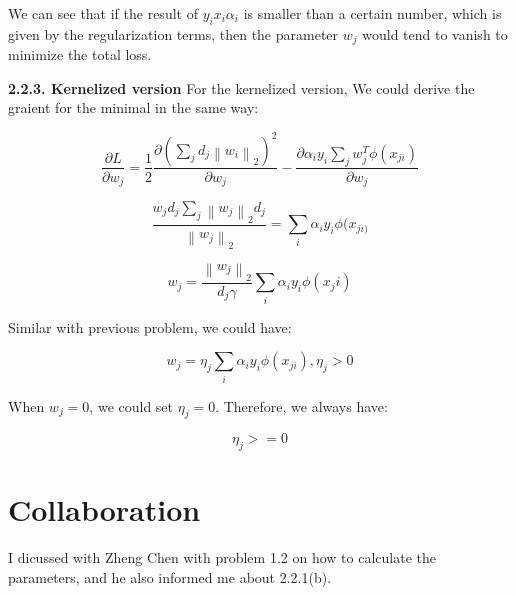 \documentclass{article} %
\newcommand{\norm}[1]{\left\lVert #1 \right\rVert}
\begin{document}
We can see that if the result of $y_i x_i \alpha_i$ is smaller than a certain
number, which is given by the regularization terms, then the parameter $w_j$
would tend to vanish to minimize the total loss.

\textbf{2.2.3. Kernelized version}
For the kernelized version, We could derive the graient for the minimal in the
same way:

\begin{equation}
\frac{\partial L}{\partial w_j} = \frac{1}{2} \frac{\partial (\sum_j d_j
\norm{w_i}_2)^2}{\partial w_j} - \frac{\partial \alpha_i y_i \sum_j w_j^T
\phi (x_{ji})}{\partial w_j}
\end{equation}

\begin{equation}
\frac{w_j d_j \sum_j \norm{w_j}_2 d_j }{\norm{w_j}_2} = \sum_i \alpha_i y_i \phi
(x_{ji)}
\end{equation}

\begin{equation}
w_j = \frac{\norm{w_j}_2}{d_j \gamma} \sum_i \alpha_i y_i \phi (x_ji)
\end{equation}

Similar with previous problem, we could have:

\begin{equation}
w_j = \eta_j \sum_i \alpha_i y_i \phi (x_{ji}), \eta_j > 0
\end{equation}

When $w_j = 0$, we could set $\eta_j = 0$. Therefore, we always have:

\begin{equation}
\eta_j >= 0
\end{equation}








\section{Collaboration}
I dicussed with Zheng Chen with problem 1.2 on how to calculate the parameters,
and he also informed me about 2.2.1(b).
\end{document}
